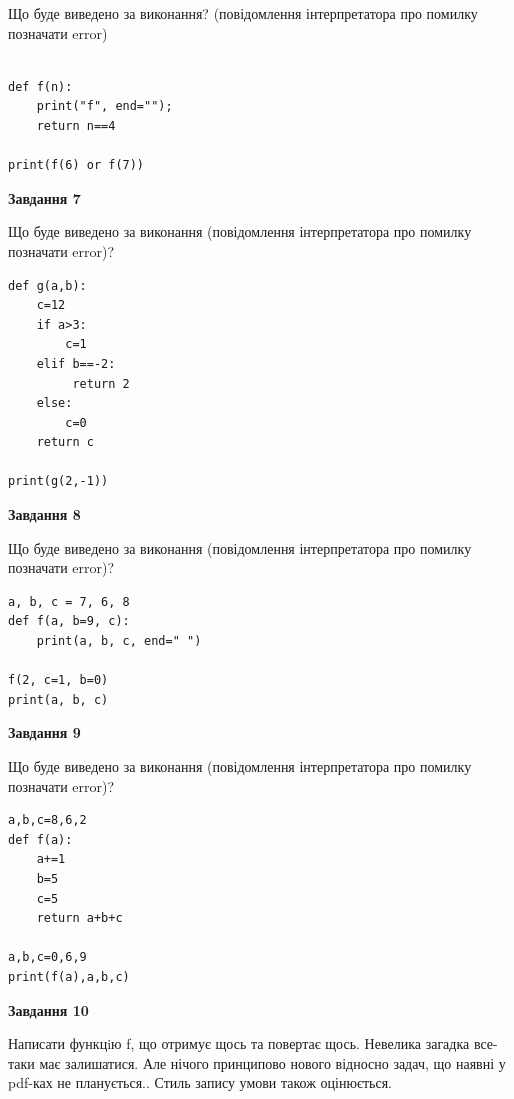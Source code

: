 \documentclass[12pt, ukrainian]{article}
\begin{document}
{\begin {large}
Що буде виведено за виконання? (повідомлення інтерпретатора про помилку позначати error)\par
\begin{verbatim}

def f(n):
    print("f", end="");
    return n==4

print(f(6) or f(7))
\end{verbatim}

{\begin {center}\textbf{Завдання 7}\end {center}}

Що буде виведено за виконання (повідомлення інтерпретатора про помилку позначати error)?\par
\begin{verbatim}
def g(a,b):
    c=12
    if a>3:
        c=1
    elif b==-2:
         return 2
    else: 
        c=0
    return c

print(g(2,-1))
\end{verbatim}

{\begin {center}\textbf{Завдання 8}\end {center}}

Що буде виведено за виконання (повідомлення інтерпретатора про помилку позначати error)?\par
\begin{verbatim}
a, b, c = 7, 6, 8
def f(a, b=9, c):
    print(a, b, c, end=" ")

f(2, c=1, b=0)
print(a, b, c)
\end{verbatim}

{\begin {center}\textbf{Завдання 9}\end {center}}

Що буде виведено за виконання (повідомлення інтерпретатора про помилку позначати error)?\par
\begin{verbatim}
a,b,c=8,6,2
def f(a):
    a+=1
    b=5
    c=5
    return a+b+c

a,b,c=0,6,9
print(f(a),a,b,c)
\end{verbatim}

{\begin {center}\textbf{Завдання 10}\end {center}}


Написати функцiю f, що отримує щось та повертає щось. Невелика загадка все-таки має залишатися. Але нічого принципово нового відносно задач, що наявні у pdf-ках не планується.. Стиль запису умови також оцінюється.\par
\end {large}}
\newpage
\end{document}
